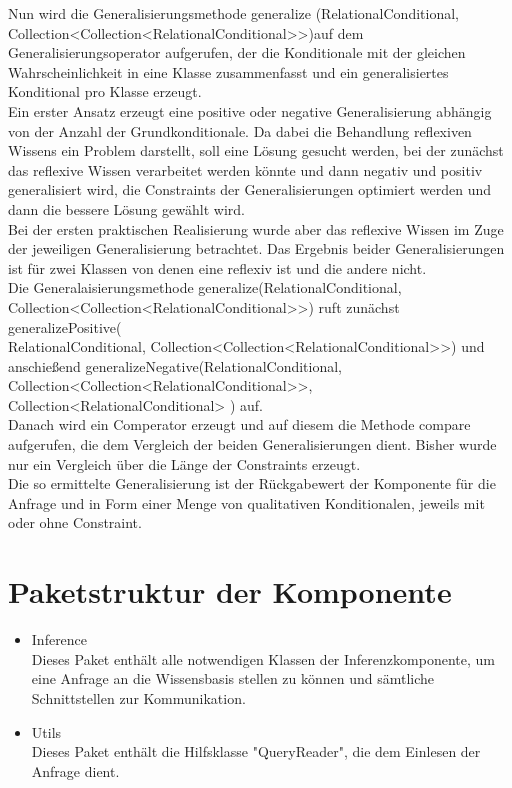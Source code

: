 \documentclass[draft]{scrreprt}
\begin{document}
{Nun wird die Generalisierungsmethode generalize (RelationalConditional, \\ Collection<Collection<RelationalConditional>>)auf dem  Generalisierungsoperator aufgerufen, der die Konditionale mit der gleichen Wahrscheinlichkeit in eine Klasse zusammenfasst und ein generalisiertes Konditional pro Klasse erzeugt.\\
Ein erster Ansatz erzeugt eine positive oder negative Generalisierung abhängig von der Anzahl der Grundkonditionale. Da dabei die Behandlung reflexiven Wissens ein Problem darstellt, soll eine Lösung gesucht werden, bei der zunächst das reflexive Wissen verarbeitet werden könnte und dann negativ und positiv generalisiert wird, die Constraints der Generalisierungen optimiert werden und dann die bessere Lösung gewählt wird. \\
Bei der ersten praktischen Realisierung wurde aber das reflexive Wissen im Zuge der jeweiligen Generalisierung betrachtet. Das Ergebnis beider Generalisierungen ist für zwei Klassen von denen eine reflexiv ist und die andere nicht.\\
Die Generalaisierungsmethode generalize(RelationalConditional,\\ Collection<Collection<RelationalConditional>>) ruft zunächst generalizePositive(\\RelationalConditional,
Collection<Collection<RelationalConditional>>) und anschießend generalizeNegative(RelationalConditional,
Collection<Collection<RelationalConditional>>,
Collection<RelationalConditional> ) auf.\\
Danach wird ein Comperator erzeugt und auf diesem die Methode compare aufgerufen, die dem Vergleich der beiden Generalisierungen dient. Bisher wurde nur ein Vergleich über die Länge der Constraints erzeugt.\\
Die so ermittelte Generalisierung ist der Rückgabewert der Komponente für die Anfrage und in Form einer Menge von qualitativen Konditionalen, jeweils mit oder ohne Constraint.






\section{Paketstruktur der Komponente}
\begin{itemize}
	\item Inference\\
	Dieses Paket enthält alle notwendigen Klassen der Inferenzkomponente, um eine Anfrage an die Wissensbasis stellen zu können und sämtliche Schnittstellen zur Kommunikation. 
	\item Utils\\
	Dieses Paket enthält die Hilfsklasse "{}QueryReader"{}, die dem Einlesen der Anfrage dient.
\end{itemize}

}
\end{document}
